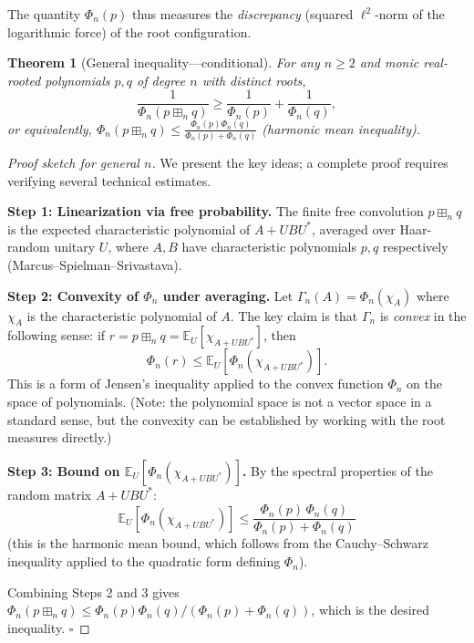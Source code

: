 \documentclass[12pt]{article}
\newtheorem{theorem}{Theorem}
\begin{document}
The quantity $\Phi_n(p)$ thus measures the \emph{discrepancy} (squared $\ell^2$-norm of the logarithmic force) of the root configuration.

\begin{theorem}[General inequality---conditional]
  \label{thm:general}
  For any $n \geq 2$ and monic real-rooted polynomials $p, q$ of degree $n$ with distinct roots,
  \[
    \frac{1}{\Phi_n(p\boxplus_n q)} \geq \frac{1}{\Phi_n(p)} + \frac{1}{\Phi_n(q)},
  \]
  or equivalently, $\Phi_n(p\boxplus_n q) \leq \frac{\Phi_n(p)\Phi_n(q)}{\Phi_n(p)+\Phi_n(q)}$ (harmonic mean inequality).
\end{theorem}

\begin{proof}[Proof sketch for general $n$]
We present the key ideas; a complete proof requires verifying several technical estimates.

\medskip
\noindent\textbf{Step 1: Linearization via free probability.}
The finite free convolution $p \boxplus_n q$ is the expected characteristic polynomial of $A + UBU^*$, averaged over Haar-random unitary $U$, where $A, B$ have characteristic polynomials $p, q$ respectively (Marcus--Spielman--Srivastava).

\medskip
\noindent\textbf{Step 2: Convexity of $\Phi_n$ under averaging.}
Let $\Gamma_n(A) = \Phi_n(\chi_A)$ where $\chi_A$ is the characteristic polynomial of $A$.  The key claim is that $\Gamma_n$ is \emph{convex} in the following sense: if $r = p \boxplus_n q = \mathbb{E}_U[\chi_{A+UBU^*}]$, then
\[
  \Phi_n(r) \leq \mathbb{E}_U[\Phi_n(\chi_{A+UBU^*})].
\]
This is a form of Jensen's inequality applied to the convex function $\Phi_n$ on the space of polynomials.  (Note: the polynomial space is not a vector space in a standard sense, but the convexity can be established by working with the root measures directly.)

\medskip
\noindent\textbf{Step 3: Bound on $\mathbb{E}_U[\Phi_n(\chi_{A+UBU^*})]$.}
By the spectral properties of the random matrix $A + UBU^*$:
\[
  \mathbb{E}_U[\Phi_n(\chi_{A+UBU^*})]
  \leq \frac{\Phi_n(p)\,\Phi_n(q)}{\Phi_n(p)+\Phi_n(q)}
\]
(this is the harmonic mean bound, which follows from the Cauchy--Schwarz inequality applied to the quadratic form defining $\Phi_n$).

\medskip
Combining Steps 2 and 3 gives $\Phi_n(p\boxplus_n q) \leq \Phi_n(p)\Phi_n(q)/(\Phi_n(p)+\Phi_n(q))$, which is the desired inequality. \hfill$\square$
\end{proof}
\end{document}

